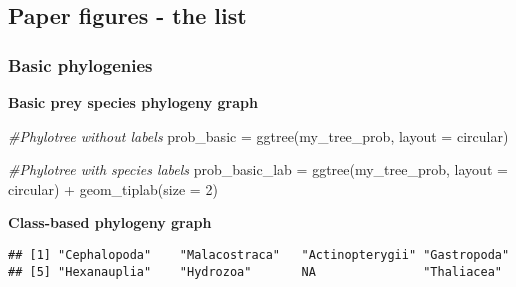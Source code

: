 \documentclass[
]{article}
\newenvironment{Shaded}{\begin{snugshade}}{\end{snugshade}}
\newcommand{\AttributeTok}[1]{\textcolor[rgb]{0.77,0.63,0.00}{#1}}
\newcommand{\CommentTok}[1]{\textcolor[rgb]{0.56,0.35,0.01}{\textit{#1}}}
\newcommand{\DecValTok}[1]{\textcolor[rgb]{0.00,0.00,0.81}{#1}}
\newcommand{\FunctionTok}[1]{\textcolor[rgb]{0.00,0.00,0.00}{#1}}
\newcommand{\NormalTok}[1]{#1}
\newcommand{\OtherTok}[1]{\textcolor[rgb]{0.56,0.35,0.01}{#1}}
\newcommand{\SpecialCharTok}[1]{\textcolor[rgb]{0.00,0.00,0.00}{#1}}
\newcommand{\StringTok}[1]{\textcolor[rgb]{0.31,0.60,0.02}{#1}}
\begin{document}
\hypertarget{paper-figures---the-list}{%
\subsection{Paper figures - the list}\label{paper-figures---the-list}}

\hypertarget{basic-phylogenies}{%
\subsubsection{Basic phylogenies}\label{basic-phylogenies}}

\textbf{Basic prey species phylogeny graph}

\begin{Shaded}
\begin{Highlighting}[]
\CommentTok{\#Phylotree without labels}
\NormalTok{prob\_basic }\OtherTok{=} \FunctionTok{ggtree}\NormalTok{(my\_tree\_prob, }\AttributeTok{layout =} \StringTok{\textquotesingle{}circular\textquotesingle{}}\NormalTok{)}

\CommentTok{\#Phylotree with species labels}
\NormalTok{prob\_basic\_lab }\OtherTok{=} \FunctionTok{ggtree}\NormalTok{(my\_tree\_prob, }\AttributeTok{layout =} \StringTok{\textquotesingle{}circular\textquotesingle{}}\NormalTok{) }\SpecialCharTok{+} \FunctionTok{geom\_tiplab}\NormalTok{(}\AttributeTok{size =} \DecValTok{2}\NormalTok{)}
\end{Highlighting}
\end{Shaded}

\textbf{Class-based phylogeny graph}

\begin{Shaded}
\end{Shaded}

\begin{verbatim}
## [1] "Cephalopoda"    "Malacostraca"   "Actinopterygii" "Gastropoda"    
## [5] "Hexanauplia"    "Hydrozoa"       NA               "Thaliacea"
\end{verbatim}
\end{document}

